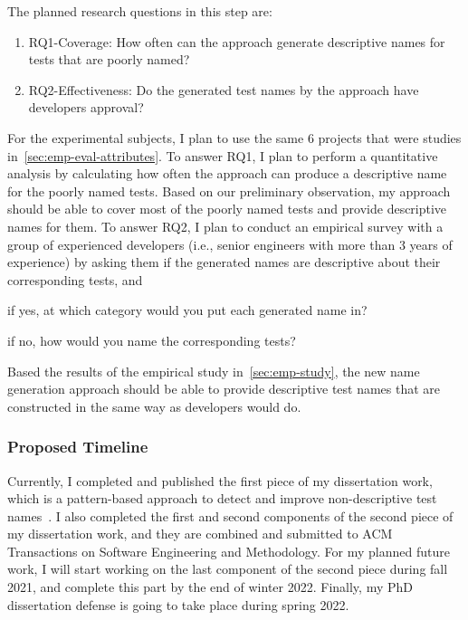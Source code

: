 The planned research questions in this step are:
%
\begin{enumerate}
    \item RQ1-Coverage: How often can the approach generate descriptive names for tests that are poorly named?
    \item RQ2-Effectiveness: Do the generated test names by the approach have developers approval?
\end{enumerate}
%
For the experimental subjects, I plan to use the same \num{6} projects that were studies in~\cref{sec:emp-eval-attributes}.
%
To answer RQ1, I plan to perform a quantitative analysis by calculating how often the approach can produce a descriptive name for the poorly named tests.
%
Based on our preliminary observation, my approach should be able to cover most of the poorly named tests and provide descriptive names for them.
%
To answer RQ2, I plan to conduct an empirical survey with a group of experienced developers (i.e., senior engineers with more than \num{3} years of experience) by asking them if the generated names are descriptive about their corresponding tests, and
\begin{enumerate*}
    \item if yes, at which category would you put each generated name in?
    \item if no, how would you name the corresponding tests?
\end{enumerate*}
%
Based the results of the empirical study in~\cref{sec:emp-study}, the new name generation approach should be able to provide descriptive test names that are constructed in the same way as developers would do.


\subsubsection{Proposed Timeline}

Currently, I completed and published the first piece of my dissertation work, which is a pattern-based approach to detect and improve non-descriptive test names~\cite{wu2020pattern}.
%
I also completed the first and second components of the second piece of my dissertation work, and they are combined and submitted to ACM Transactions on Software Engineering and Methodology.
%
For my planned future work, I will start working on the last component of the second piece during fall 2021, and complete this part by the end of winter 2022.
%
Finally, my PhD dissertation defense is going to take place during spring 2022.